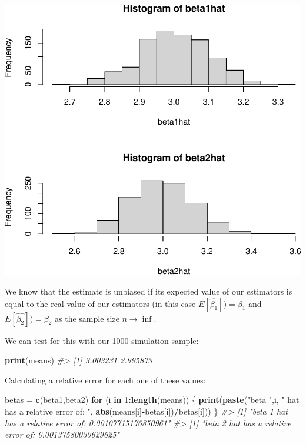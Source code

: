 \documentclass[]{article}
\newenvironment{Shaded}{\begin{snugshade}}{\end{snugshade}}
\newcommand{\CommentTok}[1]{\textcolor[rgb]{0.56,0.35,0.01}{\textit{#1}}}
\newcommand{\ControlFlowTok}[1]{\textcolor[rgb]{0.13,0.29,0.53}{\textbf{#1}}}
\newcommand{\DecValTok}[1]{\textcolor[rgb]{0.00,0.00,0.81}{#1}}
\newcommand{\KeywordTok}[1]{\textcolor[rgb]{0.13,0.29,0.53}{\textbf{#1}}}
\newcommand{\NormalTok}[1]{#1}
\newcommand{\OperatorTok}[1]{\textcolor[rgb]{0.81,0.36,0.00}{\textbf{#1}}}
\newcommand{\StringTok}[1]{\textcolor[rgb]{0.31,0.60,0.02}{#1}}
\begin{document}
\includegraphics{./figures/unnamed-chunk-4-1.pdf}

We know that the estimate is unbiased if its expected value of our
estimators is equal to the real value of our estimators (in this case
\(E[ \hat{\beta_{1}}]) = \beta_{1}\) and
\(E[ \hat{\beta_{2}}]) = \beta_{2}\) as the sample size
\(n \rightarrow \inf\).

We can test for this with our 1000 simulation sample:

\begin{Shaded}
\begin{Highlighting}[]
\KeywordTok{print}\NormalTok{(means)}
\CommentTok{#> [1] 3.003231 2.995873}
\end{Highlighting}
\end{Shaded}

Calculating a relative error for each one of these values:

\begin{Shaded}
\begin{Highlighting}[]
\NormalTok{betas =}\StringTok{ }\KeywordTok{c}\NormalTok{(beta1,beta2)}
\ControlFlowTok{for}\NormalTok{ (i }\ControlFlowTok{in} \DecValTok{1}\OperatorTok{:}\KeywordTok{length}\NormalTok{(means)) \{}
    \KeywordTok{print}\NormalTok{(}\KeywordTok{paste}\NormalTok{(}\StringTok{"beta "}\NormalTok{,i, }\StringTok{" hat has a relative error of: "}\NormalTok{, }\KeywordTok{abs}\NormalTok{(means[i]}\OperatorTok{-}\NormalTok{betas[i])}\OperatorTok{/}\NormalTok{betas[i]))}
\NormalTok{\}   }
\CommentTok{#> [1] "beta  1  hat has a relative error of:  0.00107715176850961"}
\CommentTok{#> [1] "beta  2  hat has a relative error of:  0.00137580030629625"}
\end{Highlighting}
\end{Shaded}
\end{document}
